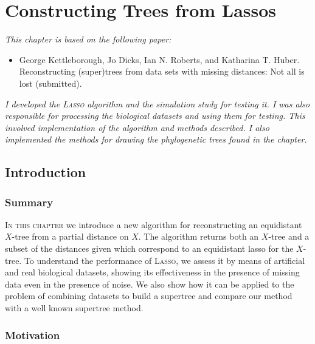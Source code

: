 \chapter{Constructing Trees from Lassos}
\label{cha:lasso-construction}

\textit{This chapter is based on the following paper:}

\vspace{0.5em}

\noindent

\begin{itemize}
\item George Kettleborough, Jo Dicks, Ian N. Roberts, and Katharina T. Huber.
  Reconstructing (super)trees from data sets with missing distances: Not all
  is lost (submitted).
\end{itemize}

\vspace{1em}

\textit{I developed the \textsc{Lasso} algorithm and the simulation study for
  testing it.  I was also responsible for processing the biological datasets
  and using them for testing.  This involved implementation of the algorithm
  and methods described.  I also implemented the methods for drawing the
  phylogenetic trees found in the chapter.}

\newpage

\section{Introduction}
\label{sec:introduction}

\subsection{Summary}

\textsc{In this chapter} we introduce a new algorithm for reconstructing an
equidistant $X$-tree from a partial distance on $X$.  The algorithm returns
both an $X$-tree and a subset of the distances given which correspond to an
equidistant lasso for the $X$-tree.  To understand the performance of
\textsc{Lasso}, we assess it by means of artificial and real biological
datasets, showing its effectiveness in the presence of missing data even in
the presence of noise.  We also show how it can be applied to the problem of
combining datasets to build a supertree and compare our method with a well
known supertree method.

\subsection{Motivation}
\label{sec:lasso-motivation}

